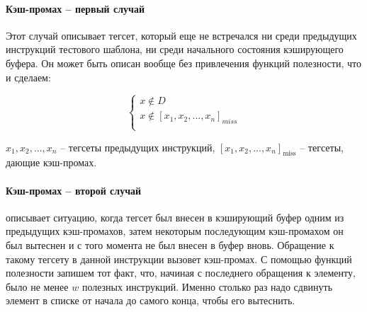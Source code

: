 \paragraph{Кэш-промах -- первый случай} Этот случай описывает
тегсет, который еще не встречался ни среди предыдущих инструкций
тестового шаблона, ни среди начального состояния кэширующего буфера.
Он может быть описан вообще без привлечения функций полезности, что
и сделаем:

\begin{equation}
\left\{
\begin{array}{l}
x \notin D\\
x \notin [x_1, x_2, ..., x_n]_{miss}\\
\end{array}
\right.
\end{equation}

$x_1, x_2, ..., x_n$ -- тегсеты предыдущих инструкций, $[x_1, x_2,
..., x_n]_{\mbox{miss}}$ -- тегсеты, дающие кэш-промах.

\paragraph{Кэш-промах -- второй случай} описывает ситуацию, когда
тегсет был внесен в кэширующий буфер одним из предыдущих
кэш-промахов, затем некоторым последующим кэш-промахом он был
вытеснен и с того момента не был внесен в буфер вновь. Обращение к
такому тегсету в данной инструкции вызовет кэш-промах. С помощью
функций полезности запишем тот факт, что, начиная с последнего
обращения к элементу, было не менее $w$ полезных инструкций. Именно
столько раз надо сдвинуть элемент в списке \LRU от начала до самого
конца, чтобы его вытеснить.

